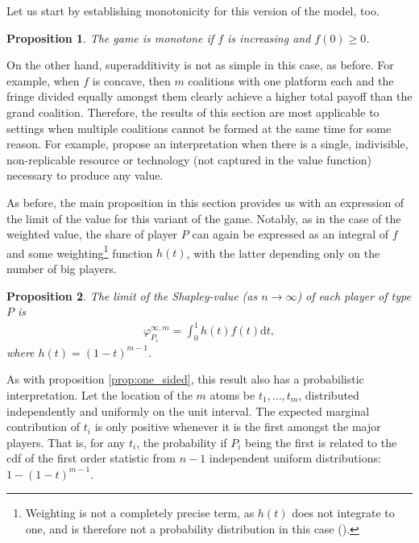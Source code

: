 \documentclass[a4paper]{article}
\newtheorem{proposition}{Proposition}
\newcommand{\dt}{\mathrm{d}t}
\begin{document}
Let us start by establishing monotonicity for this version of the model, too.
\begin{proposition}
    The game is monotone if $f$ is increasing and $f(0) \geq 0$.
\end{proposition}
On the other hand, superadditivity is not as simple in this case, as before.
For example, when $f$ is concave, then $m$ coalitions with one platform each and the fringe divided equally amongst them clearly achieve a higher total payoff than the grand coalition.
Therefore, the results of this section are most applicable to settings when multiple coalitions cannot be formed at the same time for some reason.
For example, \textcite{hart1996bargaining} propose an interpretation when there is a single, indivisible, non-replicable resource or technology (not captured in the value function) necessary to produce any value.

As before, the main proposition in this section provides us with an expression of the limit of the value for this variant of the game.
Notably, as in the case of the weighted value, the share of player $P$ can again be expressed as an integral of $f$ and some weighting\footnote{
    Weighting is not a completely precise term, as $h(t)$ does not integrate to one, and is therefore not a probability distribution in this case ().
} function $h(t)$, with the latter depending only on the number of big players.
\begin{proposition}
    \label{prop:multiple_platforms}
    The limit of the Shapley-value (as $n \to \infty$) of each player of type $P$ is
    \begin{align*}
        \varphi_{P_i}^{\infty, m} = \int_0^1 h(t) f(t) \dt,
    \end{align*}
    where $h(t) = (1-t) ^ {m-1}$.
\end{proposition}

As with proposition \ref{prop:one_sided}, this result also has a probabilistic interpretation.
Let the location of the $m$ atoms be $t_1, \dots, t_m$, distributed independently and uniformly on the unit interval.
The expected marginal contribution of $t_i$ is only positive whenever it is the first amongst the major players.
That is, for any $t_i$, the probability if $P_i$ being the first is related to the cdf of the first order statistic from $n-1$ independent uniform distributions: $1 - (1-t)^{m-1}$.
\end{document}
